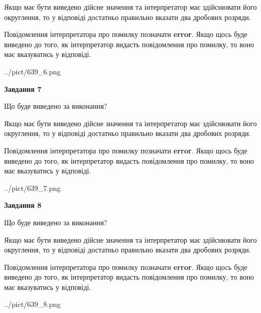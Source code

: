\documentclass[12pt, ukrainian]{article}
\begin{document}
{\begin {Large}
Якщо має бути виведено дійсне значення та інтерпретатор має здійснювати його округлення, 
то у відповіді достатньо правильно вказати два дробових розряди.

Повідомлення інтерпретатора про помилку позначати \textbf{error}.
Якщо щось буде виведено до того, як інтерпретатор видасть повідомлення про помилку, 
то воно має вказуватись у відповіді. \par

\begin{center}
	{../pict/639_6.png}
\end{center}
\newpage

{\begin {center}\textbf{Завдання 7}\end {center}}\par
Що буде виведено за виконання? \par

Якщо має бути виведено дійсне значення та інтерпретатор має здійснювати його округлення, 
то у відповіді достатньо правильно вказати два дробових розряди.

Повідомлення інтерпретатора про помилку позначати \textbf{error}.
Якщо щось буде виведено до того, як інтерпретатор видасть повідомлення про помилку, 
то воно має вказуватись у відповіді. \par

\begin{center}
	{../pict/639_7.png}
\end{center}
\newpage

{\begin {center}\textbf{Завдання 8}\end {center}}\par
Що буде виведено за виконання? \par

Якщо має бути виведено дійсне значення та інтерпретатор має здійснювати його округлення, 
то у відповіді достатньо правильно вказати два дробових розряди.

Повідомлення інтерпретатора про помилку позначати \textbf{error}.
Якщо щось буде виведено до того, як інтерпретатор видасть повідомлення про помилку, 
то воно має вказуватись у відповіді. \par

\begin{center}
	{../pict/639_8.png}
\end{center}
\newpage


\end{Large}}
\end{document}
